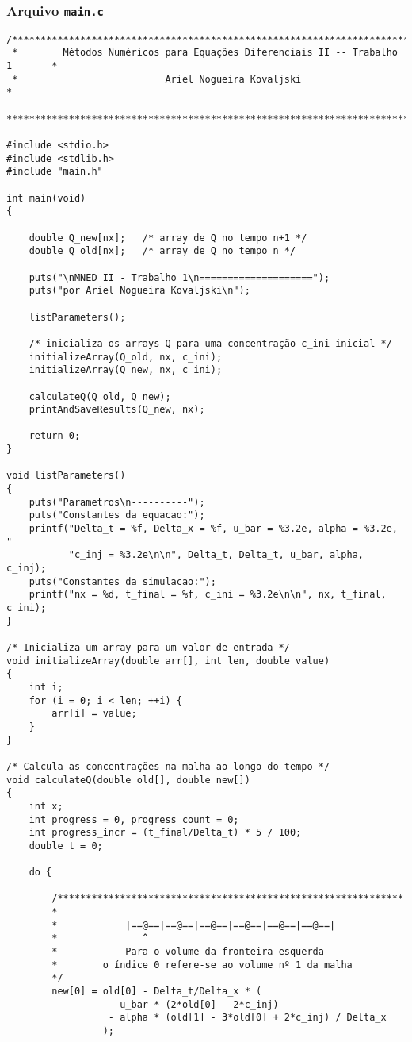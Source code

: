 \subsubsection{Arquivo \texttt{main.c}}
\begin{Verbatim}[fontsize=\footnotesize]
/******************************************************************************
 *        Métodos Numéricos para Equações Diferenciais II -- Trabalho 1       *
 *                          Ariel Nogueira Kovaljski                          *
 ******************************************************************************/

#include <stdio.h>
#include <stdlib.h>
#include "main.h"

int main(void)
{

    double Q_new[nx];   /* array de Q no tempo n+1 */
    double Q_old[nx];   /* array de Q no tempo n */

    puts("\nMNED II - Trabalho 1\n====================");
    puts("por Ariel Nogueira Kovaljski\n");

    listParameters();

    /* inicializa os arrays Q para uma concentração c_ini inicial */
    initializeArray(Q_old, nx, c_ini);
    initializeArray(Q_new, nx, c_ini);

    calculateQ(Q_old, Q_new);
    printAndSaveResults(Q_new, nx);

    return 0;
}

void listParameters()
{
    puts("Parametros\n----------");
    puts("Constantes da equacao:");
    printf("Delta_t = %f, Delta_x = %f, u_bar = %3.2e, alpha = %3.2e, "
           "c_inj = %3.2e\n\n", Delta_t, Delta_t, u_bar, alpha, c_inj);
    puts("Constantes da simulacao:");
    printf("nx = %d, t_final = %f, c_ini = %3.2e\n\n", nx, t_final, c_ini);
}

/* Inicializa um array para um valor de entrada */
void initializeArray(double arr[], int len, double value)
{
    int i;
    for (i = 0; i < len; ++i) {
        arr[i] = value;
    }
}

/* Calcula as concentrações na malha ao longo do tempo */
void calculateQ(double old[], double new[])
{
    int x;
    int progress = 0, progress_count = 0;
    int progress_incr = (t_final/Delta_t) * 5 / 100;
    double t = 0;

    do {

        /*************************************************************
        *
        *            |==@==|==@==|==@==|==@==|==@==|==@==|
        *               ^
        *            Para o volume da fronteira esquerda
        *        o índice 0 refere-se ao volume nº 1 da malha
        */
        new[0] = old[0] - Delta_t/Delta_x * (
                    u_bar * (2*old[0] - 2*c_inj)
                  - alpha * (old[1] - 3*old[0] + 2*c_inj) / Delta_x
                 );


\end{Verbatim}
